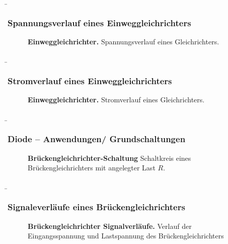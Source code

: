 \begin{frame}
    \b{ \frametitle{Spannungsverlauf eines Einweggleichrichters}
        \begin{figure}[H]

            \centering
                 

            \caption{\textbf{Einweggleichrichter.} Spannungsverlauf eines Gleichrichters. }
        \end{figure}
    }   

\end{frame}

\begin{frame}
    \b{ \frametitle{ Stromverlauf eines Einweggleichrichters}
    
    \begin{figure}
        \centering
        
        \caption{\textbf{Einweggleichrichter.} Stromverlauf eines Gleichrichters. }  
    \end{figure}
    }
\end{frame}


\begin{frame}
    \b{ \frametitle{Diode -- Anwendungen/ Grundschaltungen}
        \begin{figure}[H]
            \centering
            
            \label{fig:BrueckengleichrichterSchaltungFolie}
            \caption{\textbf{Brückengleichrichter-Schaltung} Schaltkreis eines Brückengleichrichters mit angelegter Last $R$.} 
        \end{figure}
    }
\end{frame}

\begin{frame}
    \b{ \frametitle{Signaleverläufe eines Brückengleichrichters}
        \begin{figure}[H]
            \centering
            
            \caption{\textbf{Brückengleichrichter Signalverläufe.} Verlauf der Eingangsspannung und Lastspannung des 
            Brückengleichrichters }  
            \label{fig:BrueckengleichrichterSignalverlaeufeFolie}
        \end{figure}
    }
\end{frame}

